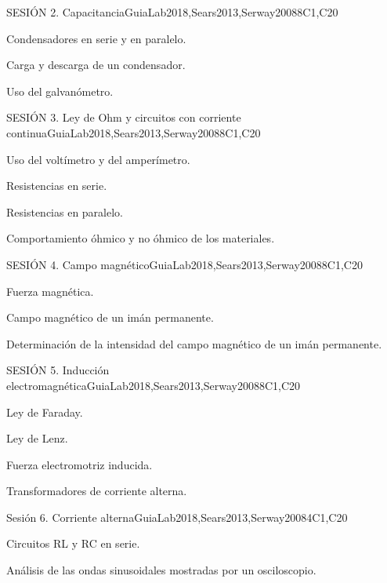 \begin{syllabus}
\begin{unit}{SESIÓN 2. Capacitancia}{}{GuiaLab2018,Sears2013,Serway2008}{8}{C1,C20}
\begin{topics}
      \item Condensadores en serie y en paralelo.
      \item Carga y descarga de un condensador.
      \item Uso del galvanómetro. 
\end{topics}
\end{unit}

\begin{unit}{SESIÓN 3. Ley de Ohm y circuitos con corriente continua}{}{GuiaLab2018,Sears2013,Serway2008}{8}{C1,C20}
\begin{topics}
      \item Uso del voltímetro y del amperímetro.
      \item Resistencias en serie.
      \item Resistencias en paralelo.
      \item Comportamiento óhmico y no óhmico de los materiales.
\end{topics}
\end{unit}

\begin{unit}{SESIÓN 4. Campo magnético}{}{GuiaLab2018,Sears2013,Serway2008}{8}{C1,C20}
\begin{topics}
      \item Fuerza magnética.
      \item Campo magnético de un imán permanente.
      \item Determinación de la intensidad del campo magnético de un imán permanente.
   \end{topics}
\end{unit}

\begin{unit}{SESIÓN 5. Inducción electromagnética}{}{GuiaLab2018,Sears2013,Serway2008}{8}{C1,C20}
\begin{topics}
	\item Ley de Faraday.
	\item Ley de Lenz.
	\item Fuerza electromotriz inducida.
	\item Transformadores de corriente alterna.
   \end{topics}
\end{unit}

\begin{unit}{Sesión 6. Corriente alterna}{}{GuiaLab2018,Sears2013,Serway2008}{4}{C1,C20}
   \begin{topics}
	\item Circuitos RL y RC en serie.
	\item Análisis de las ondas sinusoidales mostradas por un osciloscopio.
   \end{topics}
\end{unit}


\begin{coursebibliography}
\end{coursebibliography}

\end{syllabus}
